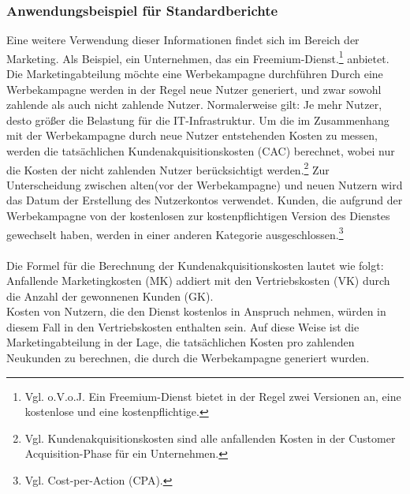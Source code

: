 \subsubsection*{Anwendungsbeispiel für Standardberichte}
Eine weitere Verwendung dieser Informationen findet sich im Bereich der Marketing. Als Beispiel, ein Unternehmen, das ein Freemium-Dienst.\footnote{Vgl. o.V.o.J. Ein Freemium-Dienst bietet in der Regel zwei Versionen an, eine kostenlose und eine kostenpflichtige\cite{MAR2}.} anbietet. Die Marketingabteilung möchte eine Werbekampagne durchführen Durch eine Werbekampagne werden in der Regel neue Nutzer generiert, und zwar sowohl zahlende als auch nicht zahlende Nutzer. Normalerweise gilt: Je mehr Nutzer, desto größer die Belastung für die IT-Infrastruktur. Um die im Zusammenhang mit der Werbekampagne durch neue Nutzer entstehenden Kosten zu messen, werden die tatsächlichen Kundenakquisitionskosten (CAC) berechnet, wobei nur die Kosten der nicht zahlenden Nutzer berücksichtigt werden.\footnote{Vgl. Kundenakquisitionskosten sind alle anfallenden Kosten in der Customer Acquisition-Phase für ein Unternehmen\cite{MAR1}.} Zur Unterscheidung zwischen alten(vor der Werbekampagne) und neuen Nutzern wird das Datum der Erstellung des Nutzerkontos verwendet. Kunden, die aufgrund der Werbekampagne von der kostenlosen zur kostenpflichtigen Version des Dienstes gewechselt haben, werden in einer anderen Kategorie ausgeschlossen.\footnote{Vgl. Cost-per-Action (CPA)\cite{MAR3}.}
\\\\ 
Die Formel für die Berechnung der Kundenakquisitionskosten lautet wie folgt:\\
Anfallende Marketingkosten (MK) addiert mit den Vertriebskosten (VK) durch die Anzahl der gewonnenen Kunden (GK).\\
Kosten von Nutzern, die den Dienst kostenlos in Anspruch nehmen, würden in diesem Fall in den Vertriebskosten enthalten sein. Auf diese Weise ist die Marketingabteilung in der Lage, die tatsächlichen Kosten pro zahlenden Neukunden zu berechnen, die durch die Werbekampagne generiert wurden.  

